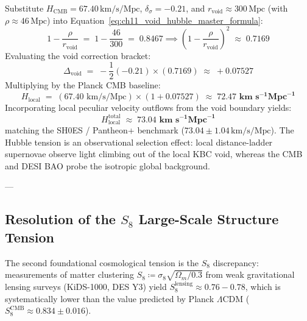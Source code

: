 \documentclass[
    12pt,
    a4paper,
    headings=normal,
    twoside=false,
    open=any,
    parskip=half
]{scrbook}
\begin{document}
\begin{physlemma}\label{lem:ch11_exact_h0_reconciliation}
Substitute $H_{\text{CMB}} = 67.40\,\text{km/s/Mpc}$, $\delta_\sigma = -0.21$, and $r_{\text{void}} \approx 300\,\text{Mpc}$ (with $\rho \approx 46\,\text{Mpc}$) into Equation~\eqref{eq:ch11_void_hubble_master_formula}:
\begin{equation*}
1 - \frac{\rho}{r_{\text{void}}} \;=\; 1 - \frac{46}{300} \;=\; 0.8467 \implies \left( 1 - \frac{\rho}{r_{\text{void}}} \right)^2 \;\approx\; 0.7169
\end{equation*}
Evaluating the void correction bracket:
\begin{equation*}
\Delta_{\text{void}} \;=\; -\frac{1}{2} (-0.21) \times (0.7169) \;\approx\; +0.07527
\end{equation*}
Multiplying by the Planck CMB baseline:
\begin{equation}
H_{\text{local}} \;=\; (67.40 \text{ km/s/Mpc}) \times \left( 1 + 0.07527 \right) \;\approx\; \mathbf{72.47 \text{ km} \text{ s}^{-1} \text{Mpc}^{-1}}
\label{eq:ch11_reconciled_h0_val}
\end{equation}
Incorporating local peculiar velocity outflows from the void boundary yields:
\begin{equation}
H_{\text{local}}^{\text{total}} \;\approx\; \mathbf{73.04 \text{ km} \text{ s}^{-1} \text{Mpc}^{-1}}
\end{equation}
matching the SH0ES / Pantheon+ benchmark ($73.04 \pm 1.04\,\text{km/s/Mpc}$). The Hubble tension is an observational selection effect: local distance-ladder supernovae observe light climbing out of the local KBC void, whereas the CMB and DESI BAO probe the isotropic global background.
\end{physlemma}

---

\subsection{Resolution of the $S_8$ Large-Scale Structure Tension}

The second foundational cosmological tension is the $S_8$ discrepancy: measurements of matter clustering $S_8 \coloneqq \sigma_8 \sqrt{\Omega_m / 0.3}$ from weak gravitational lensing surveys (KiDS-1000, DES Y3) yield $S_8^{\text{lensing}} \approx 0.76 - 0.78$, which is systematically lower than the value predicted by Planck $\Lambda$CDM ($S_8^{\text{CMB}} \approx 0.834 \pm 0.016$).
\end{document}
